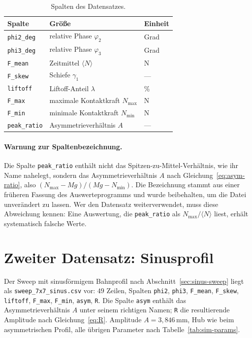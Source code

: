 \documentclass[12pt,a4paper]{report}
\begin{document}
\begin{table}[htbp]
  \centering
  \begin{tabular}{lll}
    \hline
    Spalte & Größe & Einheit \\
    \hline
    \texttt{phi2\_deg}   & relative Phase $\varphi_2$ & Grad \\
    \texttt{phi3\_deg}   & relative Phase $\varphi_3$ & Grad \\
    \texttt{F\_mean}     & Zeitmittel $\langle N \rangle$ & N \\
    \texttt{F\_skew}     & Schiefe $\gamma_1$ & --- \\
    \texttt{liftoff}     & Liftoff-Anteil $\lambda$ & \% \\
    \texttt{F\_max}      & maximale Kontaktkraft $N_{\max}$ & N \\
    \texttt{F\_min}      & minimale Kontaktkraft $N_{\min}$ & N \\
    \texttt{peak\_ratio} & Asymmetrieverhältnis $A$ & --- \\
    \hline
  \end{tabular}
  \caption{Spalten des Datensatzes.}
  \label{tab:csv-spalten}
\end{table}

\paragraph{Warnung zur Spaltenbezeichnung.}
Die Spalte \texttt{peak\_ratio} enthält nicht das
Spitzen-zu-Mittel-Verhältnis, wie ihr Name nahelegt, sondern das
Asymmetrieverhältnis $A$ nach Gleichung~\eqref{eq:asym-ratio}, also
$(N_{\max}-Mg)/(Mg-N_{\min})$. Die Bezeichnung stammt aus einer früheren
Fassung des Auswerteprogramms und wurde beibehalten, um die Datei
unverändert zu lassen. Wer den Datensatz weiterverwendet, muss diese
Abweichung kennen: Eine Auswertung, die \texttt{peak\_ratio} als
$N_{\max}/\langle N \rangle$ liest, erhält systematisch falsche Werte.

\section{Zweiter Datensatz: Sinusprofil}

Der Sweep mit sinusförmigem Bahnprofil nach
Abschnitt~\ref{sec:sinus-sweep} liegt als
\texttt{sweep\_7x7\_sinus.csv} vor: $49$ Zeilen, Spalten
\texttt{phi2}, \texttt{phi3}, \texttt{F\_mean}, \texttt{F\_skew},
\texttt{liftoff}, \texttt{F\_max}, \texttt{F\_min}, \texttt{asym},
\texttt{R}. Die Spalte \texttt{asym} enthält das Asymmetrieverhältnis
$A$ unter seinem richtigen Namen; \texttt{R} die resultierende Amplitude
nach Gleichung~\eqref{eq:R}. Amplitude $A = 3{,}846\,\mathrm{mm}$,
Hub wie beim asymmetrischen Profil, alle übrigen Parameter nach
Tabelle~\ref{tab:sim-params}.
\end{document}
